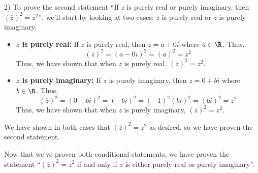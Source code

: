 \begin{paragraph}{2)}
        To prove the second statement ``If $z$ is purely real or purely imaginary,
        then $(\overline{z})^2 = z^2$'', we'll start by looking at two cases:
        $z$ is purely real or $z$ is purely imaginary.

        \begin{itemize}
            \item{
                \textbf{$z$ is purely real:} If $z$ is purely real, then $z = a + 0i$ where $a \in \R$. Thus,
                $$(\overline{z})^2 = (a - 0i)^2 = (a)^2 = z^2$$
                Thus, we have shown that when $z$ is purely real, $(\overline{z})^2 = z^2$.
            }

            \item{
                \textbf{$z$ is purely imaginary:} If $z$ is purely imaginary, then $z = 0 + bi$ where $b \in \R$. Thus,
                $$(\overline{z})^2 = (0 - bi)^2 = (-bi)^2 = (-1)^2(bi)^2 = (bi)^2 = z^2$$
                Thus, we have shown that when $z$ is purely imaginary, $(\overline{z})^2 = z^2$.
            }
        \end{itemize}
        We have shown in both cases that $(\overline{z})^2 = z^2$  as desired, so we have proven 
        the second statement.
        \spacing

        Now that we've proven both conditional statements, we have proven the statement 
        ``$(\overline{z})^2 = z^2$ if and only if $z$ is either purely real or purely imaginary''.
        
        \proofEnd
    \end{paragraph}

    \bigskip

